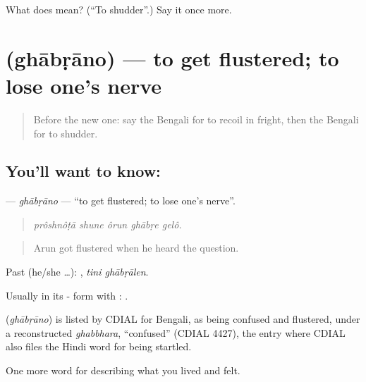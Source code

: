 \begin{tcolorbox}[breakable,colback=teal!4,colframe=teal!35!black,title={Before you move on}]
What does   mean? (\textquotedblleft{}To shudder\textquotedblright{}.) Say it once more.
\end{tcolorbox}
\section[\texorpdfstring{\bn{ঘাবড়ানো} (ghābṛāno)}{ঘাবড়ানো (ghābṛāno)}]{ (ghābṛāno) — to get flustered; to lose one's nerve}

\label{lesson:BN-C441-ghabrano}



\begin{quote}
Before the new one: say the Bengali for to recoil in fright, then the Bengali for to shudder.
\end{quote}

\subsection*{You'll want to know: }
\textbf{} — \emph{ghābṛāno} — \textquotedblleft{}to get flustered; to lose one's nerve\textquotedblright{}.

\begin{quote}
    
\end{quote}

\begin{quote}
\emph{prôshnôṭā shune ôrun ghābṛe gelô.}
\end{quote}

\begin{quote}
Arun got flustered when he heard the question.
\end{quote}

Past (he/she …):  , \emph{tini ghābṛālen}.

Usually in its - form with :  .

\begin{cousinweb}
\textbf{} (\emph{ghābṛāno}) is listed by CDIAL for Bengali, as being confused and flustered, under a reconstructed \emph{ghabbhara}, \textquotedblleft{}confused\textquotedblright{} (CDIAL 4427), the entry where CDIAL also files the Hindi word for being startled.
\end{cousinweb}

\begin{grammarlens}[title={What you've built}]
One more word for describing what you lived and felt.
\end{grammarlens}

